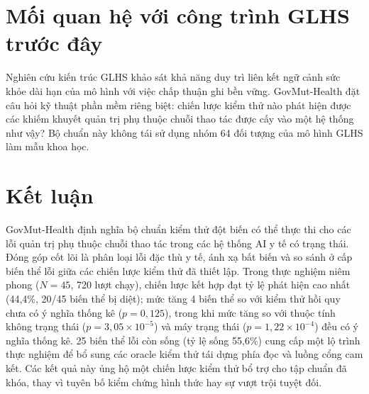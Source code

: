 \documentclass[11pt]{article}
\begin{document}
\section{Mối quan hệ với công trình GLHS trước đây}
Nghiên cứu kiến trúc GLHS khảo sát khả năng duy trì liên kết ngữ cảnh sức khỏe dài hạn của mô hình với việc chấp thuận ghi bền vững. GovMut-Health đặt câu hỏi kỹ thuật phần mềm riêng biệt: chiến lược kiểm thử nào phát hiện được các khiếm khuyết quản trị phụ thuộc chuỗi thao tác được cấy vào một hệ thống như vậy? Bộ chuẩn này không tái sử dụng nhóm 64 đối tượng của mô hình GLHS làm mẫu khoa học.

\section{Kết luận}
GovMut-Health định nghĩa bộ chuẩn kiểm thử đột biến có thể thực thi cho các lỗi quản trị phụ thuộc chuỗi thao tác trong các hệ thống AI y tế có trạng thái. Đóng góp cốt lõi là phân loại lỗi đặc thù y tế, ánh xạ bất biến và so sánh ở cấp biến thể lỗi giữa các chiến lược kiểm thử đã thiết lập. Trong thực nghiệm niêm phong ($N=45$, 720 lượt chạy), chiến lược kết hợp đạt tỷ lệ phát hiện cao nhất (44,4\%, 20/45 biến thể bị diệt); mức tăng 4 biến thể so với kiểm thử hồi quy chưa có ý nghĩa thống kê ($p = 0{,}125$), trong khi mức tăng so với thuộc tính không trạng thái ($p = 3{,}05 \times 10^{-5}$) và máy trạng thái ($p = 1{,}22 \times 10^{-4}$) đều có ý nghĩa thống kê. 25 biến thể lỗi còn sống (tỷ lệ sống 55,6\%) cung cấp một lộ trình thực nghiệm để bổ sung các oracle kiểm thử tái dựng phía đọc và luồng cổng cam kết. Các kết quả này ủng hộ một chiến lược kiểm thử bổ trợ cho tập chuẩn đã khóa, thay vì tuyên bố kiểm chứng hình thức hay sự vượt trội tuyệt đối.
\end{document}
